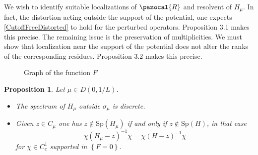 \documentclass[a4paper, 12pt]{amsart}
\numberwithin{equation}{section}
\newtheorem{proposition}{Proposition}[section]
\newcommand{\Sp}{\mathrm{Sp}} %
\newcommand{\lcb}{\left\lbrace} %
\newcommand{\rcb}{\right\rbrace} %
\newcommand{\Rpaz}{\pazocal{R}}
\DeclareMathOperator{\Supp}{\mathrm{Supp}} %
\begin{document}
We wish to identify suitable localizations of $\Rpaz$ and resolvent of $H_\mu$. In fact, the distortion acting outside the support of the potential, one expects \eqref{CutoffFreeDistorted} to hold for the perturbed operators. Proposition 3.1 makes this precise.  The remaining issue is the preservation of multiplicities. We must show that localization near the support of the potential does not alter the ranks of the corresponding residues. Proposition 3.2 makes this precise.

\begin{figure}[htbp]
    \caption{Graph of the function $F$}
    \label{FGraph}
\end{figure}  

\begin{proposition}\label{DistortedSpectrum} 
    Let $\mu\in D(0,1/L)$.
    \begin{itemize}
        \item The spectrum of $H_\mu$ outside $\sigma_\mu$ is discrete.
        \item Given $z\in C_\mu$ one has $z\not\in\Sp(H_\mu)$ if and only if $z\not\in\Sp(H)$, in that case 
        \begin{equation}\label{CutoffDistorted}
            \chi(H_\mu-z)^{-1}\chi=\chi(H-z)^{-1}\chi   
        \end{equation}
        for $\chi\in C^1_c$ supported in $\lcb F=0\rcb$.
    \end{itemize}
\end{proposition}
\end{document}
